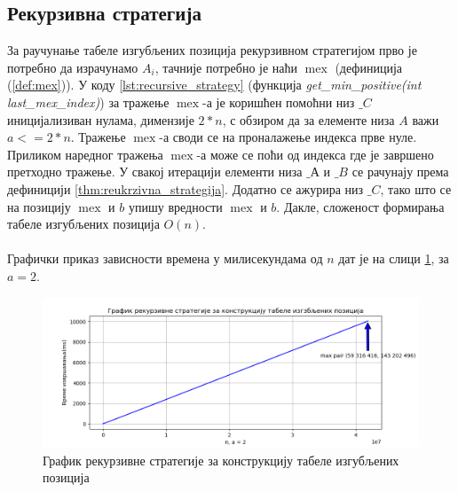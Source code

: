 \documentclass[a4paper]{article}
\DeclareMathOperator{\mex}{mex}
\begin{document}

\subsection{Рекурзивна стратегија}

За раучунање табеле изгубљених позиција рекурзивном стратегијом прво је потребно да израчунамо $ A_{i} $, тачније потребно је наћи $ \mex $ (дефиниција (\ref{def:mex})). У коду \ref{lst:recursive_strategy} (функција \textit{get\_min\_positive(int last\_mex\_index)}) за тражење $ \mex $-а је коришћен помоћни низ $ \_C $ иницијализиван нулама, димензије $ 2*n $, с обзиром да за елементе низа $ A $ важи $ a <= 2*n $. Тражење $ \mex $-а  своди се на проналажење индекса прве нуле. Приликом наредног тражења $ \mex $-а може се поћи од индекса где је завршено претходно тражење. У свакој итерацији елементи низа $ \_А $ и $ \_B $ се рачунају према дефиницији \ref{thm:reukrzivna_strategija}. Додатно се ажурира низ $ \_C $, тако што се на позицију $ \mex $ и $ b $ упишу вредности $ \mex $ и $ b $. Дакле, сложеност формирања табеле изгубљених позиција $ O(n) $.\\



\leavevmode\\
Графички приказ зависности времена у милисекундама од $ n $ дат је на слици \ref{fig:recursive}, за $ a = 2 $.

\begin{figure}[H]
	\begin{center}
		\includegraphics[width=\textwidth]{recursive.png}
	\end{center}
	\caption{График рекурзивне стратегије за конструкцију табеле изгубљених позиција}
	\label{fig:recursive}
\end{figure}
\end{document}
